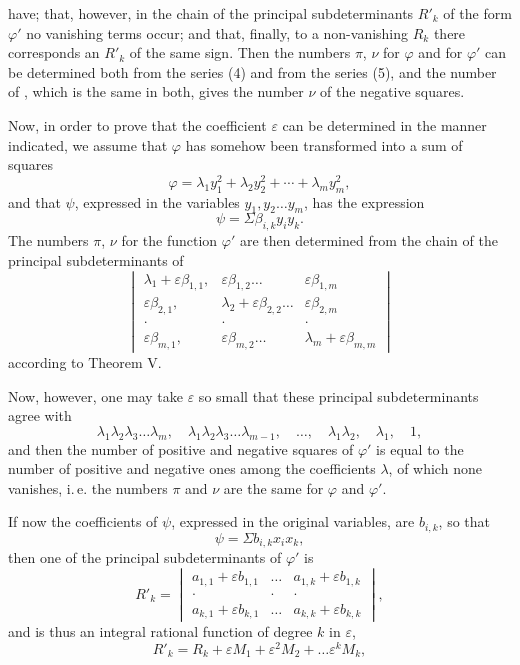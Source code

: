 have; that, however, in the chain of the principal subdeterminants
$R'_k$ of the form $\varphi'$ no vanishing terms occur; and that,
finally, to a non-vanishing $R_k$ there corresponds an $R'_k$ of the
same sign. Then the numbers $\pi$, $\nu$ for
$\varphi$ and for $\varphi'$ can be determined both from the series (4) and from the series
(5), and the number of , which
is the same in both, gives the number $\nu$ of the negative squares.

Now, in order to prove that the coefficient $\varepsilon$ can
be determined in the manner indicated, we assume
that $\varphi$ has somehow been transformed into a sum of squares
\[
\varphi = \lambda_1 y_1^2 + \lambda_2 y_2^2 + \cdots + \lambda_m y_m^2,
\]
and that $\psi$, expressed in the variables $y_1, y_2 \ldots y_m$, has the
expression
\[
\psi = \Sigma \beta_{i,k} y_i y_k.
\]
The numbers $\pi$, $\nu$ for the function $\varphi'$ are then determined from the
chain of the principal subdeterminants of
\[
\begin{vmatrix}
\lambda_1 + \varepsilon\beta_{1,1}, & \varepsilon\beta_{1,2} \ldots & \varepsilon\beta_{1,m} \\
\varepsilon\beta_{2,1}, & \lambda_2 + \varepsilon\beta_{2,2} \ldots & \varepsilon\beta_{2,m} \\
\cdot & \cdot & \cdot \\
\varepsilon\beta_{m,1}, & \varepsilon\beta_{m,2} \ldots & \lambda_m + \varepsilon\beta_{m,m}
\end{vmatrix}
\]
according to Theorem V.

Now, however, one may take $\varepsilon$ so small that these principal
subdeterminants agree  with
\[
\lambda_1\lambda_2\lambda_3 \ldots \lambda_m, \quad \lambda_1\lambda_2\lambda_3 \ldots \lambda_{m-1}, \quad \ldots, \quad \lambda_1\lambda_2, \quad \lambda_1, \quad 1,
\]
and then the number of positive and negative squares
of $\varphi'$ is equal to the number of positive and negative ones among the
coefficients $\lambda$, of which none vanishes, i.\,e. the numbers
$\pi$ and $\nu$ are the same for $\varphi$ and $\varphi'$.

If now the coefficients of $\psi$, expressed in the original
variables, are $b_{i,k}$, so that
\[
\psi = \Sigma b_{i,k} x_i x_k,
\]
then one of the principal subdeterminants of $\varphi'$ is
\[
R'_k = \begin{vmatrix}
a_{1,1} + \varepsilon b_{1,1} & \ldots & a_{1,k} + \varepsilon b_{1,k} \\
\cdot & \cdot & \cdot \\
a_{k,1} + \varepsilon b_{k,1} & \ldots & a_{k,k} + \varepsilon b_{k,k}
\end{vmatrix},
\]
and is thus an integral rational function of degree $k$ in $\varepsilon$,
\[
R'_k = R_k + \varepsilon M_1 + \varepsilon^2 M_2 + \ldots \varepsilon^k M_k,
\]
